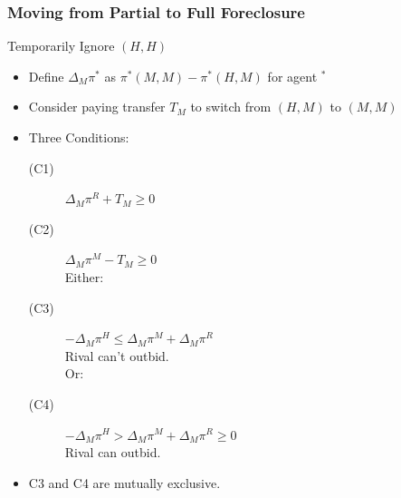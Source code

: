 \begin{frame}
\frametitle{Moving from Partial to Full Foreclosure}
Temporarily Ignore $(H,H)$
\begin{itemize}
\item Define $\Delta_M \pi^{*}$ as $\pi^*(M,M) - \pi^*(H,M)$ for agent $ ^*$ 
\item Consider paying transfer $T_M$ to switch from $(H,M)$ to $(M,M)$
\item Three Conditions:
\begin{description}
\item[(C1)] $\Delta_M \pi^R+ T_M \geq 0$
\item[(C2)] $\Delta_M \pi^M - T_M \geq 0$\\
\hspace{-0.8in}Either:
\item[(C3)]  $-\Delta_M \pi^H  \leq \Delta_M \pi^M + \Delta_M \pi^R$ \\
Rival can't outbid.\\
\hspace{-0.8in}Or:
\item[(C4)] $-\Delta_M \pi^H  > \Delta_M \pi^M + \Delta_M \pi^R \geq 0$\\
Rival can outbid.
\end{description}
\item C3 and C4 are mutually exclusive. 
\end{itemize}
\end{frame}


